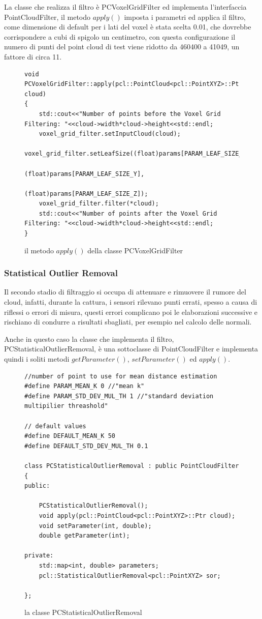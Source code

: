 \documentclass[a4paper,12pt]{article}
\begin{document}
		La classe che realizza il filtro è PCVoxelGridFilter ed implementa l'interfaccia PointCloudFilter, il metodo 
		$apply()$ imposta i parametri ed applica il filtro, come dimensione di default per i lati del voxel è stata scelta 
		0.01, che dovrebbe corrispondere a cubi di spigolo un centimetro, con questa configurazione il numero di punti
		del point cloud di test viene ridotto da 460400 a 41049, un fattore di circa 11.
		\begin{figure}[H]
		\begin{lstlisting}
void PCVoxelGridFilter::apply(pcl::PointCloud<pcl::PointXYZ>::Ptr cloud)
{
    std::cout<<"Number of points before the Voxel Grid Filtering: "<<cloud->width*cloud->height<<std::endl;
    voxel_grid_filter.setInputCloud(cloud);
    voxel_grid_filter.setLeafSize((float)params[PARAM_LEAF_SIZE_X],
                                  (float)params[PARAM_LEAF_SIZE_Y], 
                                  (float)params[PARAM_LEAF_SIZE_Z]);
    voxel_grid_filter.filter(*cloud);
    std::cout<<"Number of points after the Voxel Grid Filtering: "<<cloud->width*cloud->height<<std::endl;
}
		\end{lstlisting}
		\caption{il metodo $apply()$ della classe PCVoxelGridFilter}
		\label{apply_voxel}
		\end{figure}		
		\clearpage	 
		\subsubsection{Statistical Outlier Removal}
		Il secondo stadio di filtraggio si occupa di attenuare e rimuovere il rumore del cloud, infatti, durante la 
		cattura, i sensori rilevano punti errati, spesso a causa di riflessi o errori di misura, questi errori complicano
		poi le elaborazioni successive e rischiano di condurre a risultati sbagliati, per esempio nel calcolo delle normali.
		
		Anche in questo caso la classe che implementa il filtro, PCStatisticalOutlierRemoval, è una sottoclasse di
		PointCloudFilter e implementa quindi i soliti metodi $getParameter()$, $setParameter()$ ed $apply()$.
		\begin{figure}[H]
		\begin{lstlisting}
//number of point to use for mean distance estimation
#define PARAM_MEAN_K 0 //"mean k"
#define PARAM_STD_DEV_MUL_TH 1 //"standard deviation multipilier threashold"

// default values
#define DEFAULT_MEAN_K 50
#define DEFAULT_STD_DEV_MUL_TH 0.1

class PCStatisticalOutlierRemoval : public PointCloudFilter
{
public:

    PCStatisticalOutlierRemoval();
    void apply(pcl::PointCloud<pcl::PointXYZ>::Ptr cloud);
    void setParameter(int, double);
    double getParameter(int);

private:
    std::map<int, double> parameters;
    pcl::StatisticalOutlierRemoval<pcl::PointXYZ> sor;

};
		\end{lstlisting}
		\caption{la classe PCStatisticalOutlierRemoval}
		\label{pcstatisticaloutlierremoval}
		\end{figure}
		
\end{document}
